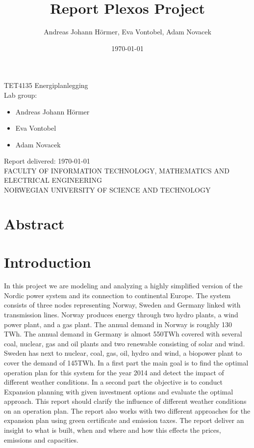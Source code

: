 \documentclass{article}
\title{Report Plexos Project}
\author{Andreas Johann H\"ormer, Eva Vontobel, Adam Novacek}
\date{\today}
\begin{document}
\thispagestyle{empty}
\maketitle
\thispagestyle{empty}
\begin{center}
TET4135 Energiplanlegging\\[3cm]
Lab group:
\begin{itemize}
\item Andreas Johann H\"ormer
\item Eva Vontobel
\item Adam Novacek\\[3cm]
\end{itemize}
Report delivered: \today\\[6cm]
FACULTY OF INFORMATION TECHNOLOGY, MATHEMATICS AND ELECTRICAL ENGINEERING\\
NORWEGIAN UNIVERSITY OF SCIENCE AND TECHNOLOGY
\end{center}
\thispagestyle{empty}
\newpage
\tableofcontents
\thispagestyle{empty}
\newpage
\listoffigures
\thispagestyle{empty}
\newpage
\section*{Abstract}
\thispagestyle{empty}

\newpage
\setcounter{page}{1}
\section{Introduction}
In this project we are modeling and analyzing a highly simplified version of the Nordic power system and its connection to continental Europe. The system consists of three nodes representing Norway, Sweden and Germany linked with transmission lines. Norway produces energy through two hydro plants, a wind power plant, and a gas plant. The annual demand in Norway is roughly 130 TWh. The annual demand in Germany is almost 550TWh covered with several coal, nuclear, gas and oil plants and two renewable consisting of solar and wind. Sweden has next to nuclear, coal, gas, oil, hydro and wind, a biopower plant to cover the demand of 145TWh. In a first part the main goal is to find the optimal operation plan for this system for the year 2014 and detect the impact of different weather conditions. In a second part the objective is to conduct Expansion planning with given investment options and evaluate the optimal approach. This report should clarify the influence of different weather conditions on an operation plan. The report also works with two different approaches for the expansion plan using  green certificate and emission taxes. The report deliver an insight to what is built, when and where and how this effects the prices, emissions and capacities.
\end{document}
